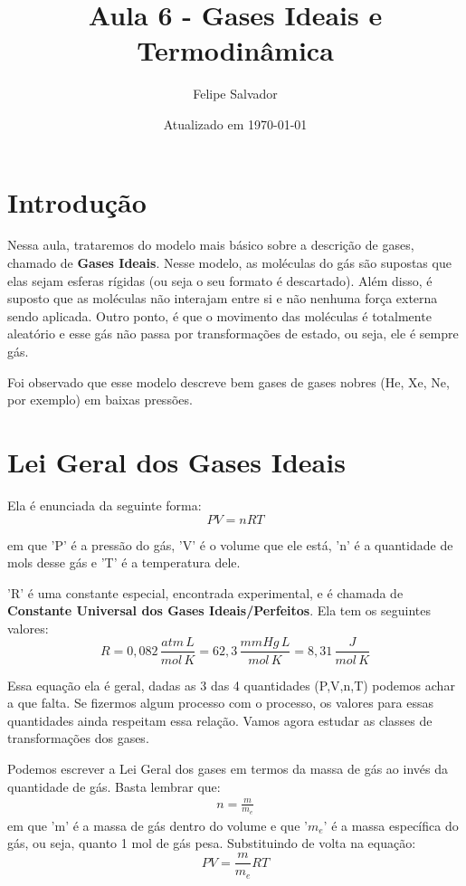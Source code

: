 \documentclass[12pt]{extarticle}
\title{Aula 6 - Gases Ideais e Termodinâmica}
\author{Felipe Salvador}
\date{Atualizado em \today}
\newcommand{\<}{\langle}
\renewcommand{\>}{\rangle}
\theoremstyle{definition}
\begin{document}
\maketitle

\section{Introdução}

Nessa aula, trataremos do modelo mais básico sobre a descrição de gases, chamado de \textbf{Gases Ideais}. Nesse modelo, as moléculas do gás são supostas que elas sejam esferas rígidas (ou seja o seu formato é descartado). Além disso, é suposto que as moléculas não interajam entre si e não nenhuma força externa sendo aplicada. Outro ponto, é que o movimento das moléculas é totalmente aleatório e esse gás não passa por transformações de estado, ou seja, ele é sempre gás.

Foi observado que esse modelo descreve bem gases de gases nobres (He, Xe, Ne, por exemplo) em baixas pressões.

\section{Lei Geral dos Gases Ideais}

Ela é enunciada da seguinte forma:
\begin{equation}\label{eq:gas}
    PV = nRT    
\end{equation}

\noindent em que 'P' é a pressão do gás, 'V' é o volume que ele está, 'n' é a quantidade de mols desse gás e 'T' é a temperatura dele.

'R' é uma constante especial, encontrada experimental, e é chamada de \textbf{Constante Universal dos Gases Ideais/Perfeitos}. Ela tem os seguintes valores:
\begin{equation}
    R = 0,082 \,\frac{atm\, L}{mol\, K} = 62,3\, \frac{mmHg\,L}{mol\, K} = 8,31\, \frac{J}{mol\,K}
\end{equation}

Essa equação ela é geral, dadas as 3 das 4 quantidades (P,V,n,T) podemos achar a que falta. Se fizermos algum processo com o processo, os valores para essas quantidades ainda respeitam essa relação. Vamos agora estudar as classes de transformações dos gases. 

Podemos escrever a Lei Geral dos gases em termos da massa de gás ao invés da quantidade de gás. Basta lembrar que:
\begin{align*}
    n = \frac{m}{m_e}
\end{align*}
\noindent em que 'm' é a massa de gás dentro do volume e que '$m_e$' é a massa específica do gás, ou seja, quanto 1 mol de gás pesa. Substituindo de volta na equação:
\begin{equation}
    PV = \frac{m}{m_e}RT
\end{equation}
\end{document}
